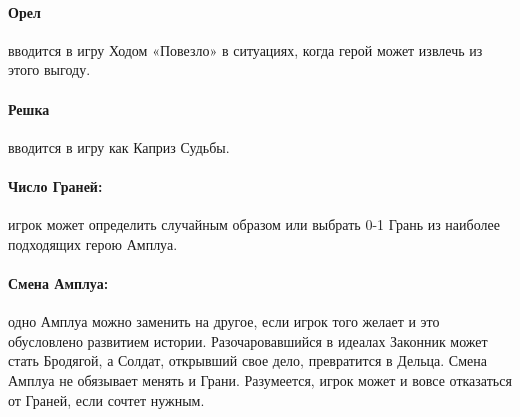 \paragraph{Орел} вводится в игру Ходом «Повезло» в ситуациях, когда герой может извлечь из этого выгоду. 
\paragraph{Решка} вводится в игру как Каприз Судьбы.
\paragraph{Число Граней:} игрок может определить случайным образом или выбрать 0-1 Грань из наиболее подходящих герою Амплуа. 
\paragraph{Смена Амплуа:} одно Амплуа можно заменить на другое, если игрок того желает и это обусловлено развитием истории. Разочаровавшийся в идеалах Законник может стать Бродягой, а Солдат, открывший свое дело, превратится в Дельца. Смена Амплуа не обязывает менять и Грани. Разумеется, игрок может и вовсе отказаться от Граней, если сочтет нужным.
\newline
{}